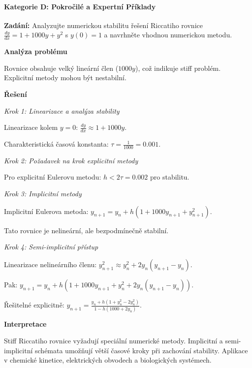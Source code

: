 \vspace{2\baselineskip}

\paragraph*{Kategorie D: Pokročilé a Expertní Příklady}
\label{par:kategorie-d-pokrocile}

\begin{example}
\label{ex:d1-numericke-stiff}

\noindent\textbf{Zadání:} Analyzujte numerickou stabilitu řešení Riccatiho rovnice $\frac{dy}{dx} = 1 + 1000y + y^2$ s $y(0) = 1$ a navrhněte vhodnou numerickou metodu.

\vspace{1.5\baselineskip}

\noindent\textbf{Analýza problému}

\noindent Rovnice obsahuje velký lineární člen ($1000y$), což indikuje stiff problém. Explicitní metody mohou být nestabilní.

\vspace{1.5\baselineskip}

\noindent\textbf{Řešení}

\noindent\textit{Krok 1: Linearizace a analýza stability}

Linearizace kolem $y = 0$: $\frac{dy}{dx} \approx 1 + 1000y$.

Charakteristická časová konstanta: $\tau = \frac{1}{1000} = 0.001$.

\noindent\textit{Krok 2: Požadavek na krok explicitní metody}

Pro explicitní Eulerovu metodu: $h < 2\tau = 0.002$ pro stabilitu.

\noindent\textit{Krok 3: Implicitní metody}

Implicitní Eulerova metoda: $y_{n+1} = y_n + h(1 + 1000y_{n+1} + y_{n+1}^2)$.

Tato rovnice je nelineární, ale bezpodmínečně stabilní.

\noindent\textit{Krok 4: Semi-implicitní přístup}

Linearizace nelineárního členu: $y_{n+1}^2 \approx y_n^2 + 2y_n(y_{n+1} - y_n)$.

Pak: $y_{n+1} = y_n + h(1 + 1000y_{n+1} + y_n^2 + 2y_n(y_{n+1} - y_n))$.

Řešitelné explicitně: $y_{n+1} = \frac{y_n + h(1 + y_n^2 - 2y_n^2)}{1 - h(1000 + 2y_n)}$.

\vspace{1.5\baselineskip}

\noindent\textbf{Interpretace}

Stiff Riccatiho rovnice vyžadují speciální numerické metody. Implicitní a 
semi-implicitní schémata umožňují větší časové kroky při zachování stability. 
Aplikace v chemické kinetice, elektrických obvodech a biologických systémech.

\end{example}

